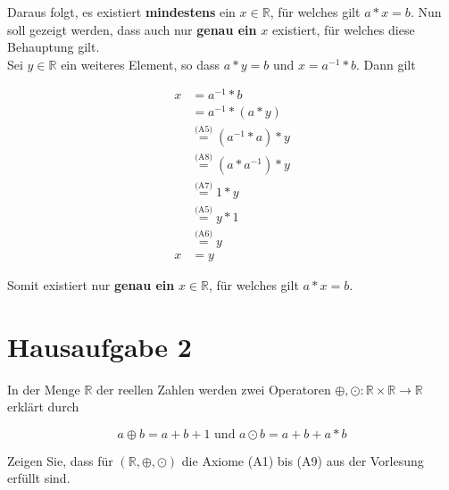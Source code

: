 \documentclass{article}
\begin{document}
\begin{enumerate}[(a)]
  Daraus folgt, es existiert \textbf{mindestens} ein $x \in \mathbb{R}$, für welches gilt $a * x = b$.
  Nun soll gezeigt werden, dass auch nur \textbf{genau ein} $x$ existiert, für welches diese Behauptung
  gilt. \\

  Sei $y \in \mathbb{R}$ ein weiteres Element, so dass $a * y = b$ und $x = a^{-1} * b$. Dann gilt

  \begin{align*}
    x &= a^{-1} * b \\
      &= a^{-1} * (a * y) \\
      &\overset{\text{(A5)}}= (a^{-1} * a) * y \\
      &\overset{\text{(A8)}}= (a * a^{-1}) * y \\
      &\overset{\text{(A7)}}= 1 * y \\
      &\overset{\text{(A5)}}= y * 1 \\
      &\overset{\text{(A6)}}= y \\
   x  &= y
  \end{align*}

  Somit existiert nur \textbf{genau ein} $x \in \mathbb{R}$, für welches gilt $a * x = b$.
\end{enumerate}

\section*{Hausaufgabe 2}

In der Menge $\mathbb{R}$ der reellen Zahlen werden zwei Operatoren $\oplus, \odot \colon \mathbb{R} \times \mathbb{R} \to \mathbb{R}$ erklärt durch

\[
  a \oplus b = a + b + 1 \text{ und } a \odot b = a + b + a * b
\]

Zeigen Sie, dass für $(\mathbb{R}, \oplus, \odot)$ die Axiome (A1) bis (A9) aus der Vorlesung erfüllt sind.
\end{document}
